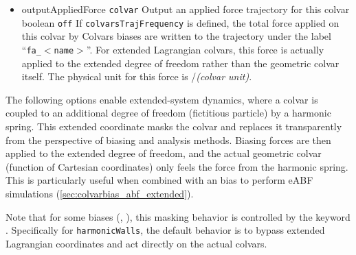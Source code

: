 \begin{itemize}
\item %
  \keydef
    {outputAppliedForce}{%
    \texttt{colvar}}{%
    Output an applied force trajectory for this
    colvar}{%
    boolean}{%
    \texttt{off}}{%
    If \texttt{colvarsTrajFrequency} is defined, the total force
    applied on this colvar by Colvars biases are
    written to the trajectory under the label
    ``\texttt{fa\_}$<$\texttt{name}$>$''.
    For extended Lagrangian colvars, this force is actually applied to the
    extended degree of freedom rather than the geometric colvar itself.
    The physical unit for this
    force is \energyunit/\textit{(colvar unit)}.}

\end{itemize}



The following options enable extended-system
dynamics, where a colvar is coupled to an additional degree of freedom
(fictitious particle) by a harmonic spring.
This extended coordinate masks the colvar and replaces it transparently from
the perspective of biasing and analysis methods.
Biasing forces are then applied to the extended degree
of freedom, and the actual geometric colvar (function of Cartesian
coordinates) only feels the force from the harmonic spring.
This is particularly useful when combined with an  bias
to perform eABF simulations (\ref{sec:colvarbias_abf_extended}).

Note that for some biases (, ),
this masking behavior is controlled by the keyword .
Specifically for \texttt{harmonicWalls}, the default behavior is to bypass extended Lagrangian
coordinates and act directly on the actual colvars.


